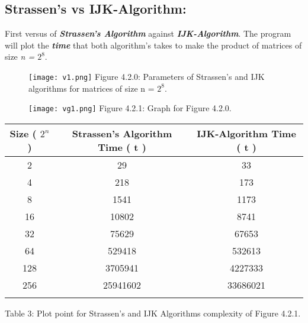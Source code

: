 \subsection{Strassen's vs IJK-Algorithm:}

First versus of {\bfseries\itshape Strassen's Algorithm} against {\bfseries\itshape IJK-Algorithm}. The program will plot the {\bfseries\itshape time} that both algorithm's takes to make the product of matrices of size {\itshape  n = $2^{8}$}. \hfill \break

{\bfseries\itshape\color{carmine}{Observation:}} {\itshape\color{carmine}{Both matrices A and B are to big to put a screen-shot of the console output, same for the resulting matrix. In compensation we will put the algorithms parameters in the console output for plotting both complexities.}} \hfill \break

\begin{figure}[H]
\texttt{[image: v1.png]}
\centering \linebreak \linebreak Figure 4.2.0: Parameters of Strassen's and IJK algorithms for matrices of size n = $2^{8}$.
\end{figure} 

\begin{figure}[H]
\texttt{[image: vg1.png]}
\centering \linebreak \linebreak Figure 4.2.1: Graph for Figure 4.2.0.
\end{figure} \hfill

\begin{center}
\begin{tabular}[.5cm]{ c c c }
\toprule
Size ( $2^{n}$ ) & Strassen's Algorithm Time ( t ) & IJK-Algorithm Time ( t ) \\
\midrule
2 & 29 & 33 \\
\cmidrule {1-3}
4 & 218 & 173 \\
\cmidrule {1-3}
8 & 1541 & 1173 \\
\cmidrule {1-3}
16 & 10802 & 8741 \\
\cmidrule {1-3}
32 & 75629 & 67653 \\
\cmidrule {1-3}
64 & 529418 & 532613 \\
\cmidrule {1-3}
128 & 3705941 & 4227333 \\
\cmidrule {1-3}
 256 & 25941602 & 33686021 \\
\bottomrule
\linebreak
\end{tabular}
\linebreak \linebreak Table 3: Plot point for Strassen's and IJK Algorithms complexity of Figure 4.2.1.
\end{center}

